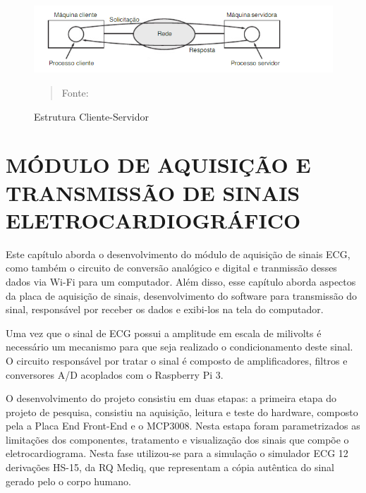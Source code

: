 \documentclass[12pt, a4paper]{article}
\begin{document}
\begin{figure}[H]
\begin{center}
			\caption{Estrutura Cliente-Servidor}
			\includegraphics[width=.9\textwidth]{Figuras/servidor.PNG}
            \vspace*{\fill} 
            \begin{quote} 
            \centering 
            Fonte: \cite{tanen}
            \end{quote}
            \vspace*{\fill}
			\label{fig:cli}
\end{center}
\end{figure}


\newpage

\section{MÓDULO DE AQUISIÇÃO E TRANSMISSÃO DE SINAIS ELETROCARDIOGRÁFICO}

\hspace*{0.8cm}Este capítulo aborda o desenvolvimento do módulo de aquisição de sinais ECG, como também o circuito de conversão analógico e digital e tranmissão desses dados via Wi-Fi para um computador. Além disso, esse capítulo aborda aspectos da placa de aquisição de sinais, desenvolvimento do software para transmissão do sinal, responsável por receber os dados e exibi-los na tela do computador. 

Uma vez que o sinal de ECG possui a amplitude em escala de milivolts é necessário um mecanismo para que seja realizado o condicionamento deste sinal. O circuito responsável por tratar o sinal é composto de amplificadores, filtros e conversores A/D acoplados com o Raspberry Pi 3. 

O desenvolvimento do projeto consistiu em duas etapas: a primeira etapa do projeto de pesquisa, consistiu na aquisição, leitura e  teste do hardware, composto pela a Placa End Front-End e o MCP3008. Nesta estapa foram parametrizados as limitações dos componentes, tratamento e visualização dos sinais que compõe o eletrocardiograma. Nesta fase utilizou-se para a simulação o simulador ECG 12 derivações HS-15, da RQ Mediq, que representam a cópia autêntica do sinal gerado pelo o corpo humano.
\end{document}
